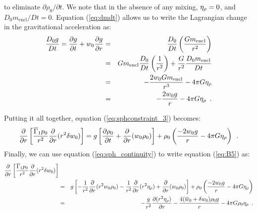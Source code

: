 to eliminate $\partial \rho_0/\partial t$.  We note that in the
absence of any mixing, $\eta_{\rho}=0$, and  $D_0 m_\mathrm{encl}/Dt = 0.$
Equation (\ref{eq:dmdt})
allows us to write the Lagrangian change in the gravitational
acceleration as:
\begin{eqnarray}
\frac{D_0 g}{D t} = \frac{\partial g}{\partial t} + w_0 \frac{\partial g}{\partial r} &=& \frac{D_0}{Dt}\left(\frac{G m_\mathrm{encl}}{r^2}\right) \nonumber \\
&=& G m_\mathrm{encl}\frac{D_0}{D t}\left(\frac{1}{r^2}\right) + \frac{G}{r^2}\frac{D_0 m_\mathrm{encl}}{Dt} \nonumber \\
&=& -\frac{2 w_0 G m_\mathrm{encl}}{r^3} - 4 \pi G \eta_{\rho} \nonumber \\
&=& -\frac{2 w_0 g}{r} - 4 \pi G \eta_{\rho} \enskip .
\end{eqnarray}

Putting it all together, equation (\ref{eq:sphconstraint_3}) becomes:
\begin{equation}
 \frac{\partial}{\partial r} \left[ \frac{\overline{\Gamma}_1 p_0}{r^2} \frac{\partial}{\partial r} (r^2 \delta w_0) \right] 
= 
  g \left [ \frac{\partial \rho_0}{\partial t} + \frac{\partial}{\partial r} (w_0 \rho_0) \right ]
+ \rho_0 \left(\frac{-2 w_0 g}{r} - 4 \pi G \eta_{\rho} \right) \label{eq:B5} \enskip.
\end{equation}
Finally, we can use equation (\ref{eq:sph_continuity})
to write equation (\ref{eq:B5}) as:
\begin{eqnarray}
\frac{\partial}{\partial r} \left[ \frac{\overline{\Gamma}_1 p_0}{r^2} \frac{\partial}{\partial r} (r^2 \delta w_0) \right] && \nonumber \\
&=&
 g \left [ -\frac{1}{r^2} \frac{\partial}{\partial r} (r^2 w_0 \rho_0)
           -\frac{1}{r^2} \frac{\partial}{\partial r} (r^2 \eta_{\rho})
           +              \frac{\partial}{\partial r} (w_0 \rho_0) \right ] + \rho_0 \left(\frac{-2 w_0 g}{r} - 4 \pi G \eta_{\rho} \right) \nonumber \\
&=& 
- \frac{g}{r^2} \frac{\partial (r^2 \eta_{\rho})}{\partial r} - \frac{4 (\overline{w}_0 + \delta w_0) \rho_0 g}{r} 
- 4 \pi G \rho_0 \eta_{\rho} \label{eq:B7} \enskip .
\end{eqnarray}

